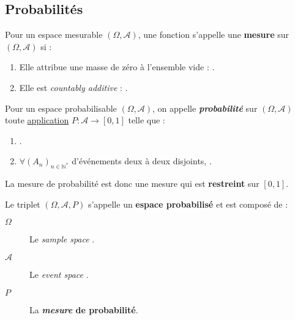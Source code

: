 \documentclass[10pt, french]{report}
\begin{document}
\begin{multicols*}{2}
\section{Probabilités}
\begin{definitionNOHFILL}[Mesure]
Pour un espace mesurable $(\Omega, \mathcal{A})$, une fonction  s'appelle une \textbf{mesure} sur $(\Omega, \mathcal{A})$ si :
\begin{enumerate}
	\item	Elle attribue une masse de zéro à l'ensemble vide : .
	\item	Elle est \og \textit{countably additive} \fg{} : .
\end{enumerate}
\end{definitionNOHFILL}


\begin{definitionNOHFILLsub}
Pour un espace probabilisable $(\Omega, \mathcal{A})$, on appelle \textbf{\textit{probabilité}} sur $(\Omega, \mathcal{A})$ toute \underline{application} $P: \mathcal{A} \rightarrow [0, 1]$ telle que :
\begin{enumerate}[label = \roman*)]
	\item	{}.
	\item	$\forall (A_{n})_{n \in \mathbb{N}^{\ast}}$ d'événements deux à deux disjoints, .
\end{enumerate}

\bigskip

La mesure de probabilité est donc une mesure qui est \textbf{restreint} sur $[0, 1]$.
\end{definitionNOHFILLsub}

\begin{definitionNOHFILL}
Le triplet $(\Omega, \mathcal{A}, P)$ s'appelle un \textbf{espace probabilisé} et est composé de : 
\begin{description}
	\item[$\Omega$]	Le \og \textit{sample space} \fg{}.
	\item[$\mathcal{A}$]	Le \og \textit{event space} \fg{}.
	\item[$P$]	La \textbf{\textit{mesure} de probabilité}.
\end{description}


\end{definitionNOHFILL}
\end{multicols*}
\end{document}
